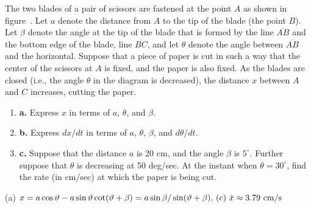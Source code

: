 \begin{exercises}
\begin{exercise}
The two blades of a pair of scissors are fastened at the point $A$ as
shown in figure~.  Let
$a$ denote the distance from $A$ to the tip of the blade (the point $B$).
Let $\beta$ denote the angle at the tip of the blade that is formed by the
line $\overline{AB}$ and the bottom edge of the blade, line
$\overline{BC}$, and let $\theta$ denote the angle between
$\overline{AB}$ and the horizontal.
Suppose that a piece of paper is cut in such a way that the center
of the scissors at $A$ is fixed, and the paper is also fixed.  As the
blades are closed (i.e., the angle $\theta$ in the diagram is decreased),
the distance $x$ between $A$ and $C$ increases, cutting the paper.
\begin{enumerate}
\item{\bf a.} Express $x$ in terms of $a$, $\theta$, and $\beta$.

\item{\bf b.} Express $dx/dt$ in terms of $a$,
$\theta$, $\beta$, and $d\theta/dt$.

\item{\bf c.} Suppose that the distance $a$ is 20 cm, and the
angle $\beta$ is $5^\circ$.  Further suppose that $\theta$ is
decreasing at 50
deg/sec.  At the instant when $\theta=30^\circ$, find the rate (in
cm/sec) at which the paper is being cut.
\end{enumerate}
\begin{answer} (a) $x=a\cos\theta-a\sin\theta\cot(\theta+\beta)=
\hbox{$a\sin\beta/\sin(\theta+\beta$), (c) $\dot x\approx 3.79$ cm/s}$
\end{answer}\end{exercise}



\end{exercises}
